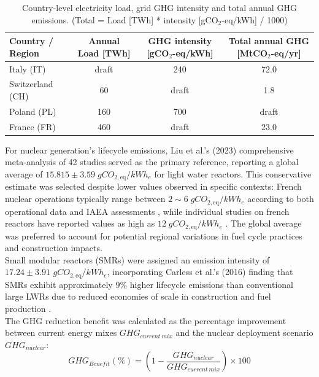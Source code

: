 \begin{table}[!ht]
    \centering
    \begin{tabularx}{\textwidth}{l c c c}
        \toprule
        Country / Region & Annual Load [TWh] & GHG intensity [gCO$_2$-eq/kWh] & Total annual GHG [MtCO$_2$-eq/yr] \\
        \midrule
        Italy (IT)        & draft & 240 & 72.0 \\
        Switzerland (CH)  & 60  & draft  & 1.8 \\
        Poland (PL)       & 160 & 700 & draft \\
        France (FR)       & 460 & draft  & 23.0 \\
        \bottomrule
    \end{tabularx}
    \caption{Country-level electricity load, grid GHG intensity and total annual GHG emissions. (Total = Load [TWh] * intensity [gCO$_2$-eq/kWh] / 1000)}
    \label{tab:ghg-intensity-country}
\end{table}

For nuclear generation's lifecycle emissions, Liu et al.'s (2023) comprehensive meta-analysis of 42 studies \cite{10.3389/fenrg.2023.1147016} served as the primary reference, reporting a global average of $15.815 \pm 3.59 \; gCO_{2,\text{eq}}/kWh_e$ for light water reactors. This conservative estimate was selected despite lower values observed in specific contexts: French nuclear operations typically range between $ 2 \sim 6 \; gCO_{2,\text{eq}}/kWh_e$ according to both operational data \cite{paillere_2021} and IAEA assessments \cite{IAEA_Climate_Change_Nuclear_Power_2022}, while individual studies on french reactors have reported values as high as $12 \; gCO_{2,\text{eq}}/kWh_e$ \cite{paillere_2021}. The global average was preferred to account for potential regional variations in fuel cycle practices and construction impacts. \\

Small modular reactors (SMRs) were assigned an emission intensity of $17.24 \pm 3.91$ $gCO_{2,\text{eq}}/kWh_e$, incorporating Carless et al.'s (2016) finding that SMRs exhibit approximately $9\%$ higher lifecycle emissions than conventional large LWRs due to reduced economies of scale in construction and fuel production \cite{CARLESS201684}. \\

The GHG reduction benefit was calculated as the percentage improvement between current energy mixes $GHG_{current\ mix}$  and the nuclear deployment scenario $GHG_{nuclear}$:
$$
GHG_{Benefit} (\%) = \left(1 - \frac{GHG_{nuclear}}{GHG_{current\ mix}}\right) \times 100
$$

